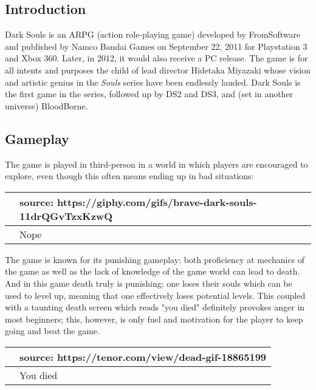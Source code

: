 \documentclass[a4paper,10pt]{book}
\begin{document}
 \subsection{Introduction }
 
          Dark Souls is an ARPG (action role-playing game) developed by FromSoftware and published by
          Namco Bandai Games on September 22, 2011 for Playstation 3 and Xbox 360. Later, in 2012, it
          would also receive a PC release. The game is for all intents and purposes the child of lead director
          Hidetaka Miyazaki whose vision and artistic genius in the  \textit{Souls } series have been endlessly lauded.
          Dark Souls is the first game in the series, followed up by DS2 and DS3, and (set in another universe) BloodBorne.
         
 
 \subsection{Gameplay }
 
          The game is played in third-person in a world in which players are encouraged to explore, even though this often means ending up in
          bad situations:
         
 
 \begin{longtable}{p{1mm}|l|}\hline
 
 &    source: https://giphy.com/gifs/brave-dark-souls-11drQGvTzxKzwQ  
 \\\hline
 
 & Nope 
 \\\hline
 \end{longtable}
 
 
          The game is known for its punishing gameplay: both proficiency at mechanics of the game as well as the lack of
          knowledge of the game world can lead to death. And in this game death truly is punishing; one loses
          their souls which can be used to level up, meaning that one effectively loses potential levels. This coupled with
          a taunting death screen which reads "you died" definitely provokes anger in most beginners; this, however, is only
          fuel and motivation for the player to keep going and beat the game.
           
 
 \begin{longtable}{p{1mm}|l|}\hline
 
 &   source: https://tenor.com/view/dead-gif-18865199  
 \\\hline
 
 & You died 
 \\\hline
 \end{longtable}
 
\end{document}
